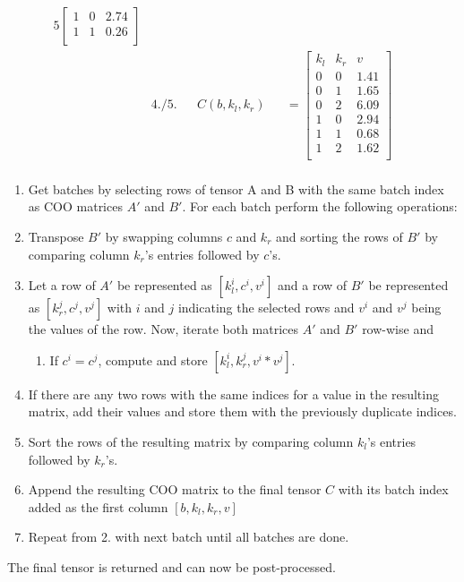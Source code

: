 \begin{alignat*}{5}
\begin{bmatrix}
                            1   & 0   & 2.74 \\
                            1   & 1   & 0.26 \\
                        \end{bmatrix}
    &&
    \\
    &4./5. &&C(b, k_l, k_r) &&= \begin{bmatrix}
                                        k_l & k_r & v    \\
                                        0   & 0   & 1.41 \\
                                        0   & 1   & 1.65 \\
                                        0   & 2   & 6.09 \\
                                        1   & 0   & 2.94 \\
                                        1   & 1   & 0.68 \\
                                        1   & 2   & 1.62 \\
                                    \end{bmatrix}
&&
    \\
\end{alignat*}
%
\begin{enumerate}[label*=\arabic*.]
    \item Get batches by selecting rows of tensor A and B with the same batch index as COO matrices
    $A'$ and $B'$. For each batch perform the following operations:
    \item Transpose $B'$ by swapping columns $c$ and $k_r$ and sorting the rows of $B'$ by comparing 
    column $k_r$'s entries followed by $c$'s.
    \item Let a row of $A'$ be represented as $[k_l^i, c^i, v^i]$ and a row of $B'$ be represented as 
    $[k_r^j, c^j, v^j]$ with $i$ and $j$ indicating the selected rows and $v^i$ and $v^j$ being the 
    values of the row. Now, iterate both matrices 
    $A'$ and $B'$ row-wise and
          \begin{enumerate}[label*=\arabic*.]
              \item[] If $c^i = c^j$, compute and store $[k_l^i, k_r^j, v^i * v^j]$.
          \end{enumerate}
    \item If there are any two rows with the same indices for a value in the resulting matrix, add 
    their values and store them with the previously duplicate indices.
    \item Sort the rows of the resulting matrix by comparing column $k_l$'s entries followed by 
    $k_r$'s.
    \item Append the resulting COO matrix to the final tensor $C$ with its batch index added as the
    first column $[b, k_l, k_r, v]$
    \item Repeat from 2. with next batch until all batches are done.
\end{enumerate}
The final tensor is returned and can now be post-processed.

